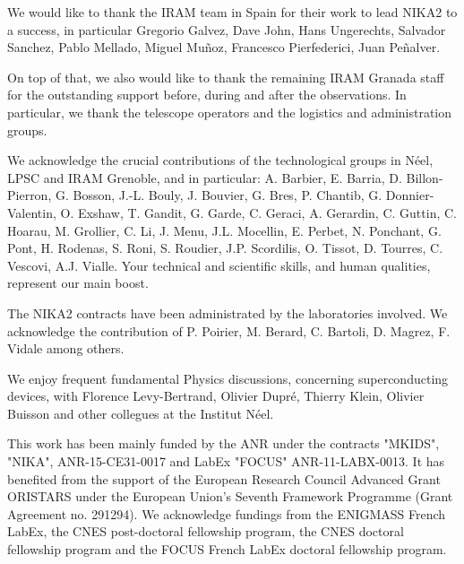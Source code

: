 \documentclass[]{aa} %
\begin{document}


\begin{acknowledgements}
We would like to thank the IRAM team in Spain for their work to lead NIKA2 to a success, in particular Gregorio Galvez, Dave John, Hans Ungerechts, Salvador Sanchez, Pablo Mellado, Miguel Mu\~noz, Francesco Pierfederici, Juan Pe\~nalver. 

On top of that, we also would like to thank the remaining IRAM Granada staff for the outstanding support before, during and after the observations. In particular, we thank the telescope operators and the logistics and administration groups. 

We acknowledge the crucial contributions of the technological groups in N\'eel, LPSC and IRAM Grenoble, and in particular: A. Barbier, E. Barria, D. Billon-Pierron, G. Bosson, J.-L. Bouly, J. Bouvier, G. Bres, P. Chantib, G. Donnier-Valentin,  O. Exshaw, T. Gandit, G. Garde, C. Geraci, A. Gerardin, C. Guttin, C. Hoarau, M. Grollier, C. Li, J. Menu, J.L. Mocellin, E. Perbet, N. Ponchant, G. Pont, H. Rodenas, S. Roni, S. Roudier, J.P. Scordilis, O. Tissot, D. Tourres, C. Vescovi, A.J. Vialle. Your technical and scientific skills, and human qualities, represent our main boost.  

The NIKA2 contracts have been administrated by the laboratories involved. We acknowledge the contribution of P. Poirier, M. Berard, C. Bartoli, D. Magrez, F. Vidale among others.

We enjoy frequent fundamental Physics discussions, concerning superconducting devices, with Florence Levy-Bertrand, Olivier Dupr\'e, Thierry Klein, Olivier Buisson and other collegues at the Institut N\'eel.

This work has been mainly funded by the ANR under the contracts "MKIDS", "NIKA", ANR-15-CE31-0017 and LabEx "FOCUS" ANR-11-LABX-0013. It has benefited from the support of the European Research Council Advanced Grant ORISTARS under the European Union's Seventh Framework Programme (Grant Agreement no. 291294). We acknowledge fundings from the ENIGMASS French LabEx, the CNES post-doctoral fellowship program, the CNES doctoral fellowship program and the FOCUS French LabEx doctoral fellowship program.


\end{acknowledgements}


%
%


%
% 
\end{document}
